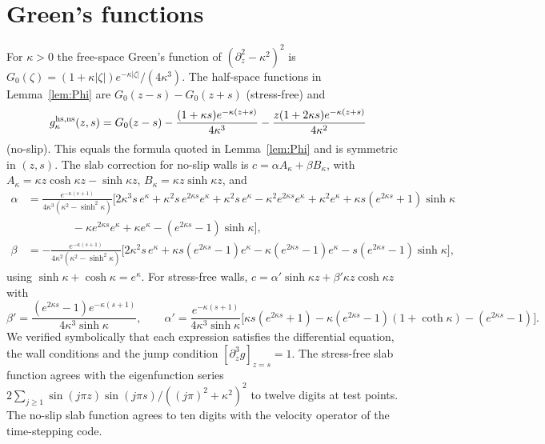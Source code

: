 \appendix
\section{Green's functions}\label{app:green}
For $\kappa>0$ the free-space Green's function of $(\partial_z^2-\kappa^2)^2$ is
$G_0(\zeta)=(1+\kappa|\zeta|)e^{-\kappa|\zeta|}/(4\kappa^3)$. The half-space functions in
Lemma~\ref{lem:Phi} are $G_0(z-s)-G_0(z+s)$ (stress-free) and
\[
g^{\rm hs,ns}_\kappa(z,s)=G_0(z-s)-\frac{(1+\kappa s)e^{-\kappa(z+s)}}{4\kappa^3}-\frac{z(1+2\kappa s)e^{-\kappa(z+s)}}{4\kappa^2}
\]
(no-slip). This equals the formula quoted in Lemma~\ref{lem:Phi} and is symmetric in $(z,s)$. The slab
correction for no-slip walls is $c=\alpha A_\kappa+\beta B_\kappa$, with $A_\kappa=\kappa z\cosh\kappa
z-\sinh\kappa z$, $B_\kappa=\kappa z\sinh\kappa z$, and
\begin{align*}
\alpha&=\frac{e^{-\kappa(s+1)}}{4\kappa^3(\kappa^2-\sinh^2\kappa)}\Big[2\kappa^3s\,e^{\kappa}+\kappa^2s\,e^{2\kappa s}e^{\kappa}+\kappa^2s\,e^{\kappa}
-\kappa^2e^{2\kappa s}e^{\kappa}+\kappa^2e^{\kappa}+\kappa s(e^{2\kappa s}+1)\sinh\kappa\\&\qquad\qquad
-\kappa e^{2\kappa s}e^{\kappa}+\kappa e^{\kappa}-(e^{2\kappa s}-1)\sinh\kappa\Big],\\
\beta&=-\frac{e^{-\kappa(s+1)}}{4\kappa^2(\kappa^2-\sinh^2\kappa)}\Big[2\kappa^2s\,e^{\kappa}+\kappa s(e^{2\kappa s}-1)e^{\kappa}-\kappa(e^{2\kappa s}-1)e^{\kappa}-s(e^{2\kappa s}-1)\sinh\kappa\Big],
\end{align*}
using $\sinh\kappa+\cosh\kappa=e^\kappa$. For stress-free walls,
$c=\alpha'\sinh\kappa z+\beta'\kappa z\cosh\kappa z$ with
\[
\beta'=\frac{(e^{2\kappa s}-1)e^{-\kappa(s+1)}}{4\kappa^3\sinh\kappa},\qquad
\alpha'=\frac{e^{-\kappa(s+1)}}{4\kappa^3\sinh\kappa}\Big[\kappa s(e^{2\kappa s}+1)-\kappa(e^{2\kappa s}-1)(1+\coth\kappa)-(e^{2\kappa s}-1)\Big].
\]
We verified symbolically that each expression satisfies the differential equation, the wall conditions and the
jump condition $[\partial_z^3g]_{z=s}=1$. The stress-free slab function agrees with the eigenfunction series
$2\sum_{j\ge1}\sin(j\pi z)\sin(j\pi s)/((j\pi)^2+\kappa^2)^2$ to twelve digits at test points. The
no-slip slab function agrees to ten digits with the velocity operator of the time-stepping code.

